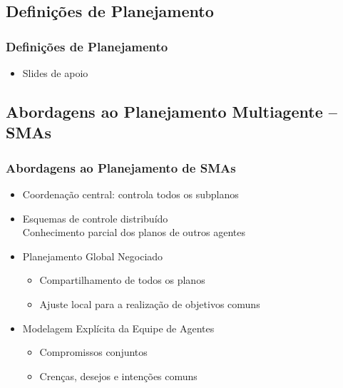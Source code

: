 \subsection{Definições de Planejamento}
\begin{frame}

    \frametitle{Definições de Planejamento}
    \begin{itemize}
    
      \item Slides de apoio
       
       
    \end{itemize}
\end{frame}



\subsection{Abordagens ao Planejamento Multiagente -- SMAs}

\begin{frame}
\frametitle{Abordagens ao Planejamento de SMAs}

\begin{block}{}
 
\begin{itemize}
  \item Coordenação central: controla todos os subplanos
  \item Esquemas de controle distribuído\\
        Conhecimento parcial dos planos de outros agentes
  \item Planejamento Global Negociado

\begin{itemize}
  \item Compartilhamento de todos os planos
  \item Ajuste local para a realização de objetivos comuns

\end{itemize}

\item Modelagem Explícita da Equipe de Agentes
\begin{itemize}
  \item Compromissos conjuntos
   \item Crenças, desejos e intenções comuns

\end{itemize}
\end{itemize}
\end{block}

\end{frame}




